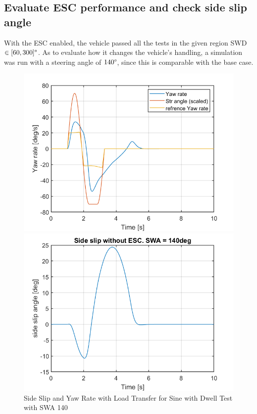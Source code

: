 \subsection{Evaluate ESC performance and check side slip angle}

With the ESC enabled, the vehicle passed all the tests in the given region SWD $\in[60,300]\degree$. As to evaluate how it changes the vehicle's handling, a simulation was run with a steering angle of $140\degree$, since this is comparable with the base case. 

\begin{figure}[H]
      \begin{minipage}[b]{0.5\linewidth}
      \centering
        \includegraphics[width=\linewidth]{Figures/3_3_ESCon.png}
    \end{minipage} 
    \begin{minipage}[b]{0.5\linewidth}
    \centering
        \includegraphics[width=\linewidth]{Figures/3_3_ESCon_sideSlip.png}
    \end{minipage} 
    \caption{Side Slip and Yaw Rate with Load Transfer for Sine with Dwell Test with SWA 140\degree}
\end{figure}


